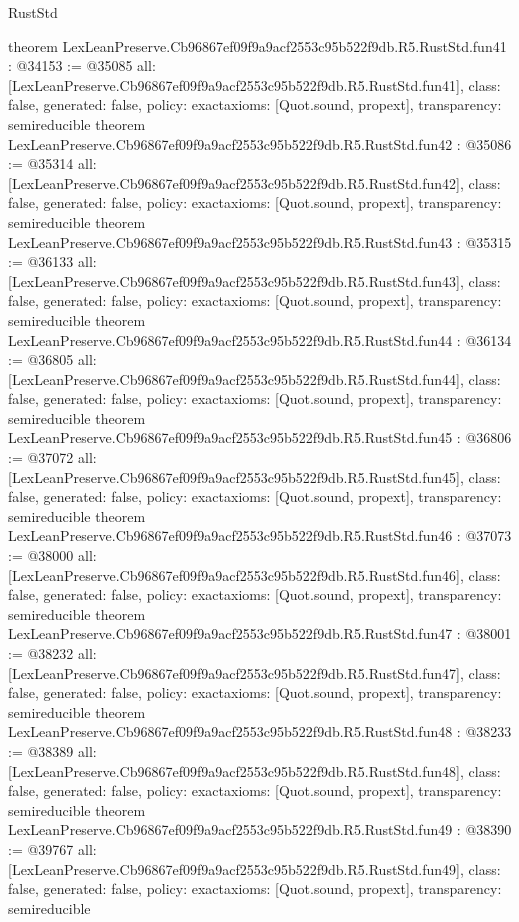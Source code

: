 \begin{lexlean}{RustStd}
\begin{coremodule}
{}
theorem LexLeanPreserve.Cb96867ef09f9a9acf2553c95b522f9db.R5.RustStd.fun41 : @34153 := @35085 {
  all: [LexLeanPreserve.Cb96867ef09f9a9acf2553c95b522f9db.R5.RustStd.fun41],
  class: false,
  generated: false,
  policy: exact{axioms: [Quot.sound, propext]},
  transparency: semireducible
}
theorem LexLeanPreserve.Cb96867ef09f9a9acf2553c95b522f9db.R5.RustStd.fun42 : @35086 := @35314 {
  all: [LexLeanPreserve.Cb96867ef09f9a9acf2553c95b522f9db.R5.RustStd.fun42],
  class: false,
  generated: false,
  policy: exact{axioms: [Quot.sound, propext]},
  transparency: semireducible
}
theorem LexLeanPreserve.Cb96867ef09f9a9acf2553c95b522f9db.R5.RustStd.fun43 : @35315 := @36133 {
  all: [LexLeanPreserve.Cb96867ef09f9a9acf2553c95b522f9db.R5.RustStd.fun43],
  class: false,
  generated: false,
  policy: exact{axioms: [Quot.sound, propext]},
  transparency: semireducible
}
theorem LexLeanPreserve.Cb96867ef09f9a9acf2553c95b522f9db.R5.RustStd.fun44 : @36134 := @36805 {
  all: [LexLeanPreserve.Cb96867ef09f9a9acf2553c95b522f9db.R5.RustStd.fun44],
  class: false,
  generated: false,
  policy: exact{axioms: [Quot.sound, propext]},
  transparency: semireducible
}
theorem LexLeanPreserve.Cb96867ef09f9a9acf2553c95b522f9db.R5.RustStd.fun45 : @36806 := @37072 {
  all: [LexLeanPreserve.Cb96867ef09f9a9acf2553c95b522f9db.R5.RustStd.fun45],
  class: false,
  generated: false,
  policy: exact{axioms: [Quot.sound, propext]},
  transparency: semireducible
}
theorem LexLeanPreserve.Cb96867ef09f9a9acf2553c95b522f9db.R5.RustStd.fun46 : @37073 := @38000 {
  all: [LexLeanPreserve.Cb96867ef09f9a9acf2553c95b522f9db.R5.RustStd.fun46],
  class: false,
  generated: false,
  policy: exact{axioms: [Quot.sound, propext]},
  transparency: semireducible
}
theorem LexLeanPreserve.Cb96867ef09f9a9acf2553c95b522f9db.R5.RustStd.fun47 : @38001 := @38232 {
  all: [LexLeanPreserve.Cb96867ef09f9a9acf2553c95b522f9db.R5.RustStd.fun47],
  class: false,
  generated: false,
  policy: exact{axioms: [Quot.sound, propext]},
  transparency: semireducible
}
theorem LexLeanPreserve.Cb96867ef09f9a9acf2553c95b522f9db.R5.RustStd.fun48 : @38233 := @38389 {
  all: [LexLeanPreserve.Cb96867ef09f9a9acf2553c95b522f9db.R5.RustStd.fun48],
  class: false,
  generated: false,
  policy: exact{axioms: [Quot.sound, propext]},
  transparency: semireducible
}
theorem LexLeanPreserve.Cb96867ef09f9a9acf2553c95b522f9db.R5.RustStd.fun49 : @38390 := @39767 {
  all: [LexLeanPreserve.Cb96867ef09f9a9acf2553c95b522f9db.R5.RustStd.fun49],
  class: false,
  generated: false,
  policy: exact{axioms: [Quot.sound, propext]},
  transparency: semireducible
}
\end{coremodule}
\end{lexlean}
